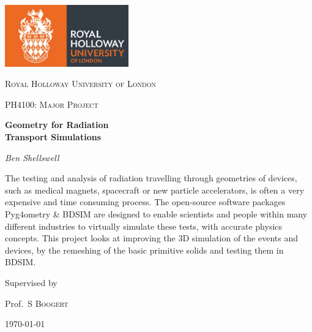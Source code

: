 \documentclass[12pt,a4paper]{article}
\begin{document}
\begin{titlepage}
	\centering
	\includegraphics[width=0.4\textwidth]{Images//Logos//rhul.jpg}\par\vspace{1cm}


	{\scshape\LARGE Royal Holloway University of London \par}
	\vspace{1cm}
	{\scshape\Large PH4100: Major Project\par}
	\vspace{1.5cm}
	{\huge\bfseries Geometry for Radiation\\
	Transport Simulations\par}
	\vspace{2cm}
	{\Large\itshape Ben Shellswell\par}
	\vfill

\begin{abstract}
\centering

\end{abstract}
The testing and analysis of radiation travelling through geometries of devices, such as medical magnets, spacecraft or new particle accelerators, is often a very expensive and time consuming process. The open-source software packages Pyg4ometry \& BDSIM are designed to enable scientists and people within many different industries to virtually simulate these tests, with accurate physics concepts. This project looks at improving the 3D simulation of the events and devices, by the remeshing of the basic primitive solids and testing them in BDSIM.

	\vfill
	
	Supervised by\par
	Prof.~S \textsc{Boogert} 

	{\large \today\par}




\end{titlepage}
\end{document}
